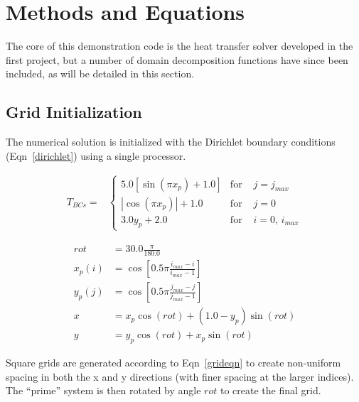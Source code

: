 \documentclass[twocolumn,10pt]{asme2ej}
\begin{document}
\section{Methods and Equations}

The core of this demonstration code is the heat transfer solver developed in the first project, but a number of domain decomposition functions have since been included, as will be detailed in this section.

\subsection{Grid Initialization}

The numerical solution is initialized with the Dirichlet boundary conditions (Eqn~\ref{dirichlet}) using a single processor.

\begin{equation}
\begin{split}
T_{BCs} = &\left\{ \begin{array}{lll}
    \mbox{$5.0 \left[ \sin\left( \pi x_p \right) + 1.0 \right]$} & \mbox{for } &j = j_{max} \\
    \mbox{$\left| \cos\left( \pi x_p \right)\right|+1.0$} & \mbox{for } &j = 0 \\
    \mbox{$3.0 y_p + 2.0$} & \mbox{for } &i = 0, \, i_{max}
     \end{array} \right.
\end{split}
\label{dirichlet}
\end{equation}

\begin{equation}
\begin{split}
   rot &= 30.0 \frac{\pi}{180.0} \\
   x_p(i) &= \cos \left[ 0.5\pi \frac{i_{max}-i}{i_{max}-1} \right] \\
   y_p(j) &= \cos \left[ 0.5\pi \frac{j_{max}-j}{j_{max}-1} \right] \\
   x &= x_p \cos(rot) + (1.0 - y_p) \sin(rot) \\
   y &= y_p \cos(rot) + x_p \sin(rot)
\end{split}
\label{grideqn}
\end{equation}

\noindent Square grids are generated according to Eqn~\ref{grideqn} to create non-uniform spacing in both the x and y directions (with finer spacing at the larger indices).  The ``prime'' system is then rotated by angle $rot$ to create the final grid.
\end{document}
